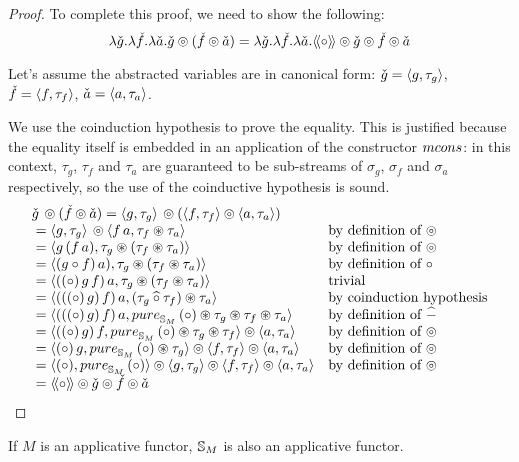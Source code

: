 \begin{lemma}
\begin{proof}
To complete this proof, we need to show the following:
$$
\lambda \check{g}. \lambda \check{f}. \lambda \check{a}. \check{g} \circledcirc (\check{f}\circledcirc \check{a})
  = 
\lambda \check{g}. \lambda \check{f}. \lambda \check{a}. \mathopen{\langle\!\langle}{\circ}\mathclose{\rangle\!\rangle} \circledcirc \check{g}  \circledcirc \check{f}  \circledcirc \check{a}
$$

Let's assume the abstracted variables are in canonical form: $\check{g} = \langle g, \tau_g \rangle$, $\check{f} = \langle f, \tau_f \rangle$, $\check{a} = \langle a, \tau_a \rangle$.

We use the coinduction hypothesis to prove the equality.
This is justified because the equality itself is embedded in an application of the constructor $\mcons$: in this context, $\tau_g$, $\tau_f$ and $\tau_a$ are guaranteed to be sub-streams of $\sigma_g$, $\sigma_f$ and $\sigma_a$ respectively, so the use of the coinductive hypothesis is sound.
$$
\begin{array}{ll}
\pstr{g}\, \pappl (\pstr{f} \pappl \pstr{a})
 = \pair{g}{\tau_g}\, \pappl (\pair{f}{\tau_f} \pappl \pair{a}{\tau_a}) \\
{}= \pair{g}{\tau_g}\, \pappl \pair{f\, a}{\tau_f \appl \tau_a}
& \mbox{by definition of }\pappl \\
{}= \pair{g\, (f\, a)}{\tau_g \appl (\tau_f \appl \tau_a)}
& \mbox{by definition of }\pappl \\
{}= \pair{(g \comp f)\, a)}{\tau_g \appl (\tau_f \appl \tau_a)}
& \mbox{by definition of }\comp \\
{}= \pair{((\comp)\, g\, f)\, a}{\tau_g \appl (\tau_f \appl \tau_a)}
& \mbox{trivial} \\
{}= \pair{(((\comp)\, g)\, f)\, a}{(\tau_g \alift{\comp} \tau_f) \appl \tau_a}
& \mbox{by coinduction hypothesis} \\
{}= \pair{(((\comp)\, g)\, f)\, a}{\apure_{\stream{M}}\, (\comp) \appl \tau_g \appl \tau_f \appl \tau_a}
& \mbox{by definition of }\alift{-} \\
{}= \pair{((\comp)\, g)\, f}{\apure_{\stream{M}}\, (\comp) \appl \tau_g \appl \tau_f} \pappl  \pair{a}{\tau_a}
& \mbox{by definition of }\pappl \\
{}= \pair{(\comp)\, g}{\apure_{\stream{M}}\, (\comp) \appl \tau_g} \pappl \pair{f}{\tau_f} \pappl \pair{a}{\tau_a}
& \mbox{by definition of }\pappl \\
{}= \pair{(\comp)}{\apure_{\stream{M}}\,(\comp)} \pappl \pair{g}{\tau_g} \pappl \pair{f}{\tau_f} \pappl \pair{a}{\tau_a}
& \mbox{by definition of }\pappl \\
{}= \ppair{\comp} \pappl \pstr{g} \pappl \pstr{f} \pappl \pstr{a}
\end{array}
$$
\end{proof}
\end{lemma}

\begin{theorem}\label{lemma:appl_laws}
If $M$ is an applicative functor, $\mathbb{S}_{M}$ is also an applicative functor.
\end{theorem}